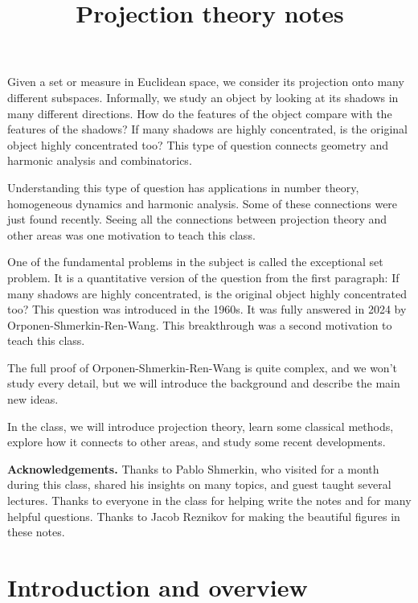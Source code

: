 \documentclass[12pt]{amsart}
\begin{document}
\title{Projection theory notes}

\maketitle
\setcounter{tocdepth}{1}


Given a set or measure in Euclidean space,  we consider its projection onto many different subspaces.   Informally,  we study an object by looking at its shadows in many different directions.   How do the features of the object compare with the features of the shadows?  If many shadows are highly concentrated,  is the original object highly concentrated too?  This type of question connects geometry and harmonic analysis and combinatorics.   

Understanding this type of question has applications in number theory,  homogeneous dynamics  and harmonic analysis.  Some of these connections were just found recently.  Seeing all the connections between projection theory and other areas was one motivation to teach this class.

One of the fundamental problems in the subject is called the exceptional set problem.  It is a quantitative version of the question from the first paragraph:  If many shadows are highly concentrated,  is the original object highly concentrated too?  This question was introduced in the 1960s.  It was fully answered in 2024 by Orponen-Shmerkin-Ren-Wang.   This breakthrough was a second motivation to teach this class.

The full proof of Orponen-Shmerkin-Ren-Wang is quite complex,  and we won't study every detail,  but we will introduce the background and describe the main new ideas.

In the class, we will introduce projection theory,   learn some classical methods,  explore how it connects to other areas,  and study some recent developments.

\vskip10pt

{\bf Acknowledgements. } Thanks to Pablo Shmerkin,  who visited for a month during this class,  shared his insights on many topics,  and guest taught several lectures.   Thanks to everyone in the class for helping write the notes and for many helpful questions.   Thanks to Jacob Reznikov for making the beautiful figures in these notes.

\newpage

\tableofcontents

\newpage

\section{Introduction and overview}
\end{document}
